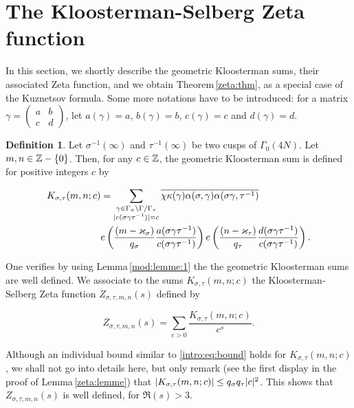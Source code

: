 \documentclass[leqno,10pt]{amsart}
\theoremstyle{plain}
\numberwithin{equation}{section}
\theoremstyle{definition}
\newtheorem{defi}[thm]{Definition}
\theoremstyle{remark}
\begin{document}
\section{The Kloosterman-Selberg Zeta function}\label{sec:zeta}

In this section, we shortly describe the geometric Kloosterman sums, their associated Zeta function, and we obtain Theorem\,\ref{zeta:thm}, as a special case of the Kuznetsov formula. Some more notations have to be introduced: for a matrix $\gamma=\left(\begin{smallmatrix} a&b \\ c&d \end{smallmatrix}\right)$, let $a(\gamma)=a$, $b(\gamma)=b$, $c(\gamma)=c$ and $d(\gamma)=d$. 

\begin{defi}\label{zeta:defi:kloo} 
Let  $\sigma^{-1}(\infty)$ and $\tau^{-1}(\infty)$ be two cusps of $\Gamma_0(4N)$. Let $m,n\in \mathbb{Z}-\{0\}$. Then, for any $c\in\mathbb{Z}$, the geometric Kloosterman sum is defined for positive integers $c$ by

\begin{equation*}
\begin{split}
K_{\sigma,\tau}(m,n;c)&=
\sum_{\substack{\gamma \in \Gamma_\sigma \backslash \Gamma / \Gamma_\tau \\ \vert c(\sigma \gamma\tau^{-1})\vert = c}} 
\overline{\chi \kappa (\gamma) \alpha (\sigma,\gamma) \alpha (\sigma \gamma,\tau^{-1})}\\
& e\left(\frac{(m-\varkappa_\sigma)}{q_\sigma}\frac{a(\sigma \gamma\tau^{-1})}{c(\sigma \gamma\tau^{-1})}\right) e\left(\frac{(n-\varkappa_\tau)}{q_\tau}\frac{d(\sigma \gamma\tau^{-1})}{c(\sigma \gamma\tau^{-1})}\right).
\end{split}
\end{equation*}
\end{defi}
One verifies by  using Lemma\,\ref{mod:lemme:1} the the geometric Kloosterman sums are well defined.
We associate to the sums $K_{\sigma,\tau}(m,n;c)$ the Kloosterman-Selberg Zeta function $Z_{\sigma,\tau,m,n}(s)$ defined by

\begin{equation}
Z_{\sigma,\tau,m,n}(s) =
\sum_{c>0}\frac{K_{\sigma,\tau}(m,n;c)}{c^s}.
\end{equation}

Although an individual bound similar to \eqref{intro:eq:bound} holds for $K_{\sigma,\tau}(m,n;c)$,
we shall not go into details here, but only remark (see the first display in the proof of Lemma\,\ref{zeta:lemme}) that $\vert K_{\sigma,\tau}(m,n;c)\vert \le q_\sigma q_\tau \vert c\vert^2$. This shows that $Z_{\sigma,\tau,m,n}(s)$ is well defined, for $\Re(s)>3$. 
\end{document}

